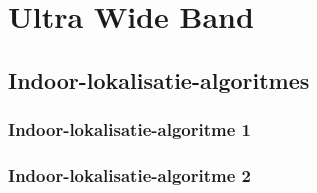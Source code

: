 \chapter{Ultra Wide Band}


\section{Indoor-lokalisatie-algoritmes}
\subsection{Indoor-lokalisatie-algoritme 1}


\subsection{Indoor-lokalisatie-algoritme 2}

